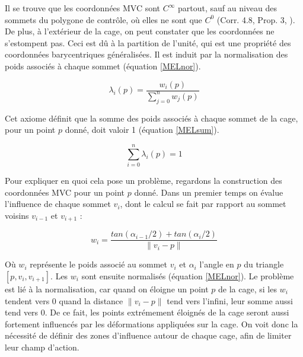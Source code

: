 Il se trouve que les coordonnées MVC sont $C^\infty$ partout, sauf au
niveau des sommets du polygone de contrôle, où elles ne sont que $C^0$
(Corr. 4.8, Prop. 3, \cite{HF06}). De plus, à l'extérieur de la cage,
on peut constater que les coordonnées ne s'estompent pas. Ceci est dû
à la partition de l'unité, qui est une propriété des coordonnées
barycentriques généralisées. Il est induit par la normalisation des
poids associés à chaque sommet (équation \ref{MELnor}).

\begin{equation}
  \lambda_i(p) = \frac{w_i(p)}{\sum_{j=0}^n w_j(p)}
  \label{MELnor}
\end{equation}

Cet axiome définit que la somme des poids associés à chaque sommet de
la cage, pour un point $p$ donné, doit valoir 1 (équation
\ref{MELsum}).

\begin{equation}
  \sum_{i=0}^n \lambda_i(p) = 1
  \label{MELsum}
\end{equation}

Pour expliquer en quoi cela pose un problème, regardons la
construction des coordonnées MVC pour un point $p$ donné. Dans un
premier temps on évalue l'influence de chaque sommet $v_i$, dont le
calcul se fait par rapport au sommet voisins $v_{i-1}$ et $v_{i+1}$ :

\begin{equation}
  w_i = \frac{tan(\alpha_{i-1}/2) + tan(\alpha_{i}/2)}{\|v_i - p\|}
\end{equation}

Où $w_i$ représente le poids associé au sommet $v_i$ et $\alpha_i$
l'angle en $p$ du triangle $[p,v_i,v_{i+1}]$. Les $w_i$ sont ensuite
normalisés (équation \ref{MELnor}). Le problème est lié à la
normalisation, car quand on éloigne un point $p$ de la cage, si les
$w_i$ tendent vers 0 quand la distance $\|v_i - p\|$ tend vers
l'infini, leur somme aussi tend vers 0. De ce fait, les points
extrémement éloignés de la cage seront aussi fortement influencés par
les déformations appliquées sur la cage. On voit donc la nécessité de
définir des zones d'influence autour de chaque cage, afin de limiter
leur champ d'action.



